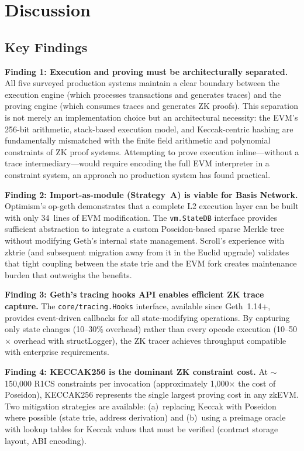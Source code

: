 
\section{Discussion}

\subsection{Key Findings}

\textbf{Finding 1: Execution and proving must be architecturally separated.}
All five surveyed production systems maintain a clear boundary between the
execution engine (which processes transactions and generates traces) and
the proving engine (which consumes traces and generates ZK proofs). This
separation is not merely an implementation choice but an architectural
necessity: the EVM's 256-bit arithmetic, stack-based execution model, and
Keccak-centric hashing are fundamentally mismatched with the finite field
arithmetic and polynomial constraints of ZK proof systems. Attempting to
prove execution inline---without a trace intermediary---would require
encoding the full EVM interpreter in a constraint system, an approach no
production system has found practical.

\textbf{Finding 2: Import-as-module (Strategy~A) is viable for Basis Network.}
Optimism's op-geth demonstrates that a complete L2 execution layer can be
built with only 34~lines of EVM modification. The \texttt{vm.StateDB}
interface provides sufficient abstraction to integrate a custom Poseidon-based
sparse Merkle tree without modifying Geth's internal state management.
Scroll's experience with zktrie (and subsequent migration away from it in the
Euclid upgrade) validates that tight coupling between the state trie and the
EVM fork creates maintenance burden that outweighs the benefits.

\textbf{Finding 3: Geth's tracing hooks API enables efficient ZK trace capture.}
The \texttt{core/tracing.Hooks} interface, available since Geth~1.14+, provides
event-driven callbacks for all state-modifying operations. By capturing only
state changes (10--30\% overhead) rather than every opcode execution
(10--50$\times$ overhead with structLogger), the ZK tracer achieves throughput
compatible with enterprise requirements.

\textbf{Finding 4: KECCAK256 is the dominant ZK constraint cost.}
At ${\sim}$150{,}000 R1CS constraints per invocation (approximately 1{,}000$\times$
the cost of Poseidon), KECCAK256 represents the single largest proving cost
in any zkEVM. Two mitigation strategies are available: (a)~replacing Keccak
with Poseidon where possible (state trie, address derivation) and (b)~using
a preimage oracle with lookup tables for Keccak values that must be verified
(contract storage layout, ABI encoding).

